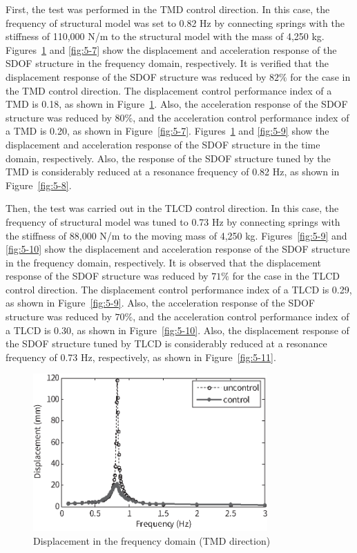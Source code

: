 First, the test was performed in the TMD control direction. In this case, the frequency of structural model was set to 0.82 Hz by connecting springs with the stiffness of 110,000 N/m to the structural model with the mass of 4,250 kg. Figures~\ref{fig:5-6} and \ref{fig:5-7} show the displacement and acceleration response of the SDOF structure in the frequency domain, respectively. It is verified that the displacement response of the SDOF structure was reduced by $82\%$ for the case in the TMD control direction. The displacement control performance index of a TMD is 0.18, as shown in Figure~\ref{fig:5-6}. Also, the acceleration response of the SDOF structure was reduced by $80\%$, and the acceleration control performance index of a TMD is 0.20, as shown in Figure~\ref{fig:5-7}. Figures~\ref{fig:5-6} and \ref{fig:5-9} show the displacement and acceleration response of the SDOF structure in the time domain, respectively. Also, the response of the SDOF structure tuned by the TMD is considerably reduced at a resonance frequency of 0.82 Hz, as shown in Figure~\ref{fig:5-8}.

Then, the test was carried out in the TLCD control direction. In this case, the frequency of structural model was tuned to 0.73 Hz by connecting springs with the stiffness of 88,000 N/m to the moving mass of 4,250 kg. Figures~\ref{fig:5-9} and \ref{fig:5-10} show the displacement and acceleration response of the SDOF structure in the frequency domain, respectively. It is observed that the displacement response of the SDOF structure was reduced by $71\%$ for the case in the TLCD control direction. The displacement control performance index of a TLCD is 0.29, as shown in Figure~\ref{fig:5-9}. Also, the acceleration response of the SDOF structure was reduced by $70\%$, and the acceleration control performance index of a TLCD is 0.30, as shown in Figure~\ref{fig:5-10}. Also, the displacement response of the SDOF structure tuned by TLCD is considerably reduced at a resonance frequency of 0.73 Hz, respectively, as shown in Figure~\ref{fig:5-11}.

\begin{figure}[ht]
\centering
\includegraphics[width=0.8\textwidth] {figure/5-6.eps}
\caption{Displacement in the frequency domain (TMD direction)}
\label{fig:5-6}
\end{figure}

